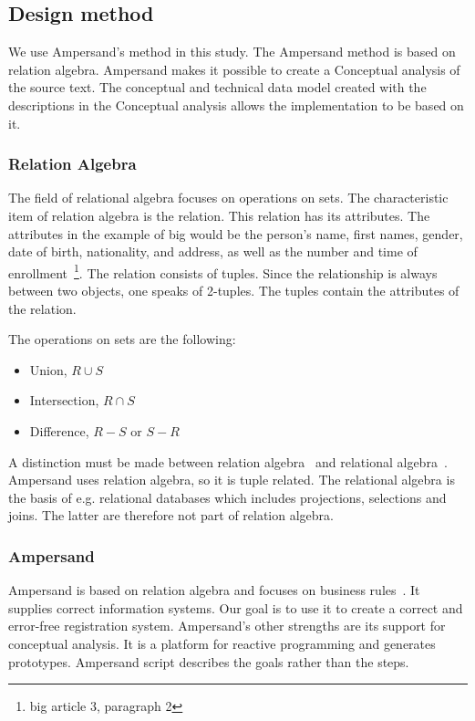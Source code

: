 \subsection{Design method} \label{design_method}
We use Ampersand's method in this study.
The Ampersand method is based on relation algebra.
Ampersand makes it possible to create a Conceptual analysis of the source text. 
The conceptual and technical data model created with the descriptions in the Conceptual analysis allows the implementation to be based on it.

\subsubsection{Relation Algebra} \label{relation_algebra}
The field of relational algebra focuses on operations on sets.
The characteristic item of relation algebra is the relation.
This relation has its attributes.
The attributes in the example of \acrshort{big} would be the person's name, first names, gender, date of birth, nationality, and address, as well as the number and time of enrollment~\footnote{\acrlong{big} article 3, paragraph 2}.
The relation consists of tuples.
Since the relationship is always between two objects, one speaks of 2-tuples.
The tuples contain the attributes of the relation.

\begin{samepage}The operations on sets are the following:
\begin{itemize}
    \item Union, $R \cup S$ %
    \item Intersection, $R \cap S$ %
    \item Difference, $R - S$ or $S - R$ %
\end{itemize}
\end{samepage}
A distinction must be made between relation algebra~\citep{maddux_bibliography_2006} and relational algebra~\citep{codd_relational_1970}.
Ampersand uses relation algebra, so it is tuple related.
The relational algebra is the basis of e.g. relational databases which includes projections, selections and joins.
The latter are therefore not part of relation algebra.


\subsubsection{Ampersand} \label{ampersand}
Ampersand is based on relation algebra and focuses on business rules~.
It supplies correct information systems.
Our goal is to use it to create a correct and error-free registration system.
Ampersand's other strengths are its support for conceptual analysis.
It is a platform for reactive programming and generates prototypes.
Ampersand script describes the goals rather than the steps.

